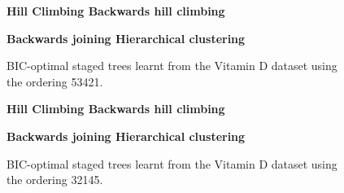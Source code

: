 \documentclass{tufte-book}
\begin{document}
\begin{figure}
   \begin{floatrow}
   \centering
   \textbf{\hspace{10mm}Hill Climbing \hspace{50mm} Backwards hill climbing}\par\medskip
{}%
\hfill
{}
   \end{floatrow}

   
      \begin{floatrow}
   \centering
   \textbf{\hspace{5mm}Backwards joining \hspace{55mm} Hierarchical clustering}\par\medskip
{}%
\hfill
{}%
   \end{floatrow}
   \caption{BIC-optimal staged trees learnt from the Vitamin D dataset using the ordering 53421.}
\end{figure}

\begin{figure}
   \begin{floatrow}
   \centering
   \textbf{\hspace{10mm}Hill Climbing \hspace{50mm} Backwards hill climbing}\par\medskip
{}%
\hfill
{}
   \end{floatrow}

   
      \begin{floatrow}
   \centering
   \textbf{\hspace{5mm}Backwards joining \hspace{55mm} Hierarchical clustering}\par\medskip
{}%
\hfill
{}%
   \end{floatrow}
   \caption{BIC-optimal staged trees learnt from the Vitamin D dataset using the ordering 32145.}
\end{figure}
\end{document}
